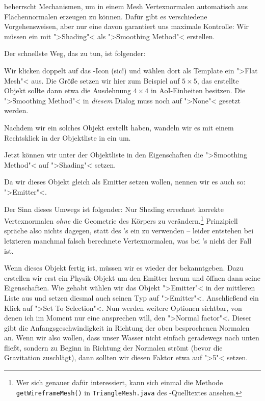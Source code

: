 \documentclass[10pt,DIV=14,a4paper]{scrartcl}
\begin{document}
\aoi beherrscht Mechanismen, um in einem Mesh Vertexnormalen automatisch
aus Flächennormalen erzeugen zu können. Dafür gibt es verschiedene
Vorgehensweisen, aber nur eine davon garantiert uns maximale Kontrolle:
Wir müssen ein \TriMesh mit ">Shading"< als ">Smoothing Method"<
erstellen.

Der schnellste Weg, das zu tun, ist folgender:
\itA
	\item Wir klicken doppelt auf das \PolyMesh-Icon (sic!) und wählen
	dort als Template ein ">Flat Mesh"< aus. Die Größe setzen wir hier
	zum Beispiel auf $5 \times 5$, das erstellte Objekt sollte dann etwa
	die Ausdehnung $4 \times 4$ in AoI-Einheiten besitzen. Die
	">Smoothing Method"< in \emph{diesem} Dialog muss noch auf ">None"<
	gesetzt werden.

	\item Nachdem wir ein solches Objekt erstellt haben, wandeln wir es
	mit einem Rechtsklick in der Objektliste in ein \TriMesh um.

	\item Jetzt können wir unter der Objektliste in den Eigenschaften
	die ">Smoothing Method"< auf ">Shading"< setzen.

	\item Da wir dieses Objekt gleich als Emitter setzen wollen, nennen
	wir es auch so: ">Emitter"<.

\itE

Der Sinn dieses Umwegs ist folgender: Nur Shading errechnet korrekte
Vertexnormalen \emph{ohne} die Geometrie des Körpers zu
verändern.\footnote{Wer sich genauer dafür interessiert, kann sich
einmal die Methode \texttt{getWireframeMesh()} in
\texttt{TriangleMesh.java} des \aoi-Quelltextes ansehen.} Prinzipiell
spräche also nichts dagegen, statt des \TriMesh's ein \PolyMesh zu
verwenden -- leider entstehen bei letzteren manchmal falsch berechnete
Vertexnormalen, was bei \TriMesh's nicht der Fall ist.

Wenn dieses Objekt fertig ist, müssen wir es wieder der \fluidsim
bekanntgeben. Dazu erstellen wir erst ein
Physik-Objekt um den Emitter herum und öffnen dann seine Eigenschaften.
Wie gehabt wählen wir das Objekt ">Emitter"< in der mittleren Liste aus
und setzen diesmal auch seinen Typ auf ">Emitter"<. Anschließend ein
Klick auf ">Set To Selection"<. Nun werden weitere Optionen sichtbar,
von denen ich im Moment nur eine ansprechen will, den ">Normal factor"<.
Dieser gibt die Anfangsgeschwindigkeit in Richtung der oben besprochenen
Normalen an.  Wenn wir also wollen, dass unser Wasser nicht einfach
geradewegs nach unten fließt, sondern zu Beginn in Richtung der Normalen
strömt (bevor die Gravitation zuschlägt), dann sollten wir diesen Faktor
etwa auf ">5"< setzen.
\end{document}
